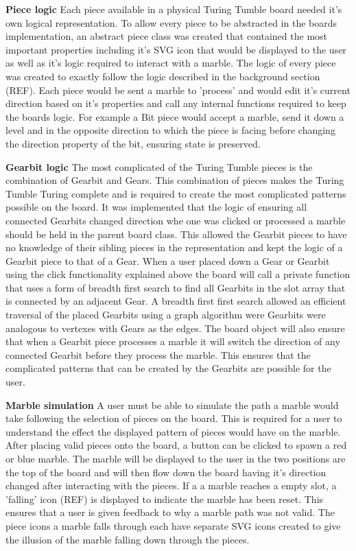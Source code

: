 \documentclass{l4proj}
\begin{document}
\textbf{Piece logic}
Each piece available in a physical Turing Tumble board needed it's own logical representation. To allow every piece to be abstracted in the boards implementation, an abstract piece class was created that contained the most important properties including it's SVG icon that would be displayed to the user as well as it's logic required to interact with a marble. The logic of every piece was created to exactly follow the logic described in the background section (REF). Each piece would be sent a marble to 'process' and would edit it's current direction based on it's properties and call any internal functions required to keep the boards logic. For example a Bit piece would accept a marble, send it down a level and in the opposite direction to which the piece is facing before changing the direction property of the bit, ensuring state is preserved. 

\textbf{Gearbit logic} 
The most complicated of the Turing Tumble pieces is the combination of Gearbit and Gears. This combination of pieces makes the Turing Tumble Turing complete and is required to create the most complicated patterns possible on the board. It was implemented that the logic of ensuring all connected Gearbits changed direction whe one was clicked or processed a marble should be held in the parent board class. This allowed the Gearbit pieces to have no knowledge of their sibling pieces in the representation and kept the logic of a Gearbit piece to that of a Gear. When a user placed down a Gear or Gearbit using the click functionality explained above the board will call a private function that uses a form of breadth first search to find all Gearbits in the slot array that is connected by an adjacent Gear. A breadth first first search allowed an efficient traversal of the placed Gearbits using a graph algorithm were Gearbits were analogous to vertexes with Gears as the edges. The board object will also ensure that when a Gearbit piece processes a marble it will switch the direction of any connected Gearbit before they process the marble. This ensures that the complicated patterns that can be created by the Gearbits are possible for the user.

\textbf{Marble simulation}
A user must be able to simulate the path a marble would take following the selection of pieces on the board. This is required for a user to understand the effect the displayed pattern of pieces would have on the marble. After placing valid pieces onto the board, a button can be clicked to spawn a red or blue marble. The marble will be displayed to the user in the two positions are the top of the board and will then flow down the board having it's direction changed after interacting with the pieces. If a a marble reaches a empty slot, a 'falling' icon (REF) is displayed to indicate the marble has been reset. This ensures that a user is given feedback to why a marble path was not valid. The piece icons a marble falls through each have separate SVG icons created to give the illusion of the marble falling down through the pieces.
\end{document}
